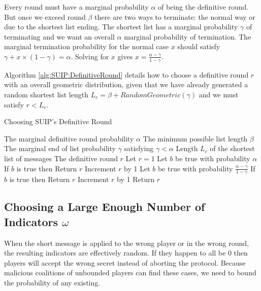 \documentclass{dalcsthesis}
\begin{document}
Every round must have a marginal probability $\alpha$ of being the definitive round. But once we exceed round $\beta$ there are two ways to terminate: the normal way or due to the shortest list ending. The shortest list has a marginal probability $\gamma$ of terminating and we want an overall $\alpha$ marginal probability of termination. The marginal termination probability for the normal case $x$ should satisfy $\gamma + x \times (1 - \gamma) = \alpha$. Solving for $x$ gives $x = \frac{\alpha - \gamma}{1 - \gamma}$.

Algorithm \ref{alg:SUIP:DefinitiveRound} details how to choose a definitive round $r$ with an overall geometric distribution, given that we have already generated a random shortest list length $L_c = \beta + RandomGeometric(\gamma)$ and we must satisfy $r < L_c$.

\begin{algorithm}
  \caption{Choosing SUIP's Definitive Round}
  \label{alg:SUIP:DefinitiveRound}
  \begin{algorithmic}[1]
    \INPUT The marginal definitive round probability $\alpha$ 
    \INPUT The minimum possible list length $\beta$
    \INPUT The marginal end of list probability $\gamma$ satisfying $\gamma < \alpha$
    \INPUT Length $L_c$ of the shortest list of messages
    \OUTPUT The definitive round $r$
    \STATE Let $r = 1$
      \STATE Let $b$ be true with probability $\alpha$
      \STATE If $b$ is true then Return $r$
      \STATE Increment $r$ by 1 
    \ENDWHILE
      \STATE Let $b$ be true with probability $\frac{\alpha - \gamma}{1 - \gamma}$
      \STATE If $b$ is true then Return $r$
      \STATE Increment $r$ by 1
    \ENDWHILE
    \STATE Return $r$
  \end{algorithmic}
\end{algorithm}

\subsection{Choosing a Large Enough Number of Indicators $\omega$}
\label{Sec:SUIP:MinIndicators}

When the short message is applied to the wrong player or in the wrong round, the resulting indicators are effectively random. If they happen to all be 0 then players will accept the wrong secret instead of aborting the protocol. Because malicious coalitions of unbounded players can find these cases, we need to bound the probability of any existing.
\end{document}
